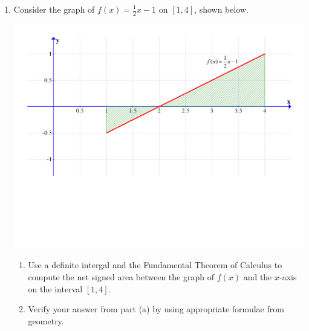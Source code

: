 \documentclass[12pt]{article}
\newif\ifans
\begin{document}
\begin{enumerate}

\item Consider the graph of $f(x)=\frac{1}{2}x-1$ on $[1,4]$, shown below.

\begin{center}

\includegraphics[scale=0.45]{area.pdf}

\end{center}

\begin{enumerate}

\item Use a definite intergal and the Fundamental Theorem of Calculus to compute the net signed area between the graph of $f(x)$ and the $x$-axis on the interval $[1,4]$.

\ifans{\fbox{$\int_1^4{\left(\frac{1}{2}x-1\right)}\,dx=\frac{3}{4}$}} \fi

\item Verify your answer from part (a) by using appropriate formulae from geometry.

\ifans{\fbox{\parbox{1\linewidth}{$A_{\text{lower triangle}}=\frac{1}{4}$; $A_{\text{upper triangle}}=1$;\\
 Thus, the value of the definite integral is $-A_{\text{lower triangle}}+A_{\text{upper triangle}}=\frac{3}{4}$}}} \fi

\end{enumerate}

\end{enumerate}
\end{document}
